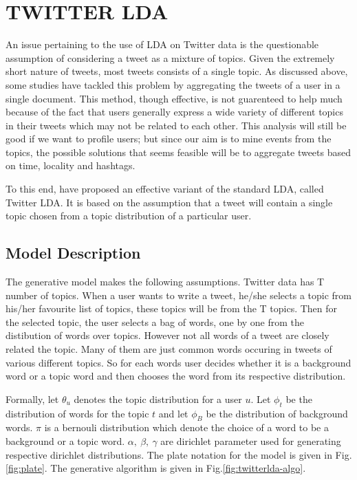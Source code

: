 
\section{\uppercase{Twitter LDA}}
An issue pertaining to the use of LDA on Twitter data is the questionable assumption of considering a tweet as a mixture of topics. Given the extremely short nature of tweets, most tweets consists of a single topic. As discussed above, some studies have tackled this problem by aggregating the tweets of a user in a single document. This method, though effective, is not guarenteed to help much because of the fact that users generally express a wide variety of different topics in their tweets which may not be related to each other. This analysis will still be good if we want to profile users; but since our aim is to mine events from the topics, the possible solutions that seems feasible will be to aggregate tweets based on time, locality and hashtags.

To this end, \cite{zhao2011comparing} have proposed an effective variant of the standard LDA, called Twitter LDA. It is based on the assumption that a tweet will contain a single topic chosen from a topic distribution of a particular user. 

\subsection{Model Description} 
The generative model makes the following assumptions. Twitter data has T number of topics. When a user wants to write a tweet, he/she selects a topic from his/her favourite list of topics, these topics will be from the T topics. Then for the selected topic, the user selects a bag of words, one by one from the distibution of words over topics. However not all words of a tweet are closely related the topic. Many of them are just common words occuring in tweets of various different topics. So for each words user decides whether it is a background word or a topic word and then chooses the word from its respective distribution.

Formally, let $\theta_u$ denotes the topic distribution for a user $u$. Let $\phi_t$ be the distribution of words for the topic $t$ and let $\phi_B$ be the distribution of background words. $\pi$ is a bernouli distribution which denote the choice of a word to be a background or a topic word. $\alpha,~\beta,~\gamma$ are dirichlet parameter used for generating respective dirichlet distributions. The plate notation for the model is given in Fig.\ref{fig:plate}. The generative algorithm is given in Fig.\ref{fig:twitterlda-algo}.